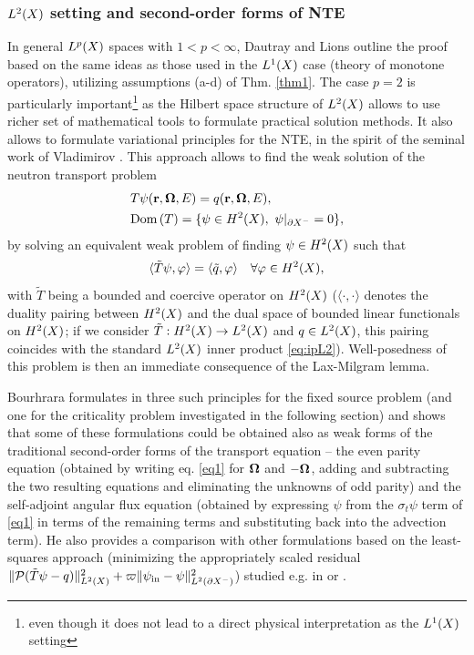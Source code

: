 \subsubsection{$\Lp[2](X)$ setting and second-order forms of NTE}\label{sec:L2}
In general $\Lp(X)$ spaces with $1 < p < \infty$, Dautray and Lions outline the proof based on the same ideas as those 
used in the $\Lp[1](X)$ case (theory of monotone operators), utilizing assumptions (a-d) of Thm. \ref{thm1}.  The case
$p = 2$ is particularly important\footnote{even though it does not lead to a direct physical interpretation as  the
$\Lp[1](X)$ setting} as the Hilbert space structure of $\Lp[2](X)$ allows to use richer set of mathematical tools to 
formulate practical solution methods. It also allows to formulate variational principles for the NTE, in the spirit of 
the seminal work of Vladimirov \cite{Vladimirov}. This approach allows to find the weak solution of the neutron 
transport problem $$
\begin{aligned}
     &T\psi(\br,\bomega,E) = q(\br,\bomega,E),\\
     &\Dom{T} = \{\psi\in \Hp[2](X),\ \psi\vert_{\pX[-]} = 0\},
  \end{aligned}
$$
by solving an equivalent weak problem of finding $\psi\in\Hp[2](X)$ such that
\begin{equation}\label{eq:weakform}
	\langle \tilde{T}\psi, \varphi \rangle = \langle \tilde{q}, \varphi \rangle  \quad \forall \varphi\in \Hp[2](X),
\end{equation}
with $\tilde{T}$ being a bounded and coercive operator on $\Hp[2](X)$ ($\langle \cdot,\cdot\rangle$ denotes the
duality pairing between $\Hp[2](X)$ and the dual space of bounded linear functionals on $\Hp[2](X)$; if we consider
$\tilde{T} : \Hp[2](X) \to \Lp[2](X)$ and $q\in \Lp[2](X)$, this pairing coincides with the standard $\Lp[2](X)$ inner
product \eqref{eq:ipL2}). Well-posedness of this problem is then an immediate consequence of the Lax-Milgram lemma. 

Bourhrara formulates in \cite{Bourhrara2} three such principles for the fixed source problem (and one for the
criticality problem investigated in the following section) and shows that some of these formulations could be obtained
also as weak forms of the traditional second-order forms of the transport equation -- the even parity equation (obtained
by writing eq.
\eqref{eq1} for $\bomega$ and $-\bomega$, adding and subtracting the two resulting equations and eliminating the
unknowns of odd parity) and the self-adjoint angular flux equation (obtained by
expressing $\psi$ from the $\sigma_t\psi$ term of \eqref{eq1} in terms of the remaining terms and substituting back into
the advection term). He also provides a comparison with other formulations based on the least-squares approach
(minimizing the appropriately scaled residual \mbox{$\norm[{\Lp[2](X)}]{\mathcal{P}(\tilde T \psi - q)}^2 +
\varpi\norm[{\Lp[2](\pX[-])}]{\psi_{\text{in}} - \psi}^2$}) studied e.g. in \cite{Manteuffel} or
\cite{Agoshkov}. 

